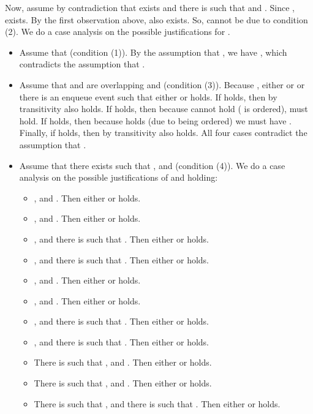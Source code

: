 \documentclass{LMCS}
\begin{document}
Now, assume by contradiction that  exists and there is  such that  and .
Since ,  exists.
By the first observation above,  also exists.
So,  cannot be due to condition (2).
We do a case analysis on the possible justifications for .
\begin{itemize}
\item Assume that  (condition (1)). 
By the assumption that , we have , which contradicts the assumption that .

\item Assume that  and  are overlapping and  (condition (3)).
Because , either  or  or there is an enqueue event  such that either  or  holds.
If  holds, then by transitivity  also holds.
If  holds, then because  cannot hold ( is ordered),  must hold.
If  holds, then because  holds (due to  being ordered) we must have .
Finally, if  holds, then by transitivity  also holds.
All four cases contradict the assumption that .

\item Assume that there exists  such that ,  and  (condition (4)).
We do a case analysis on the possible justifications of  and  holding:
\begin{itemize}

\item , and . 
Then either  or  holds.

\item , and .
Then either  or  holds.

\item , and there is  such that .
Then either  or  holds.

\item , and there is  such that .
Then either  or  holds.

\item , and .
Then either  or  holds.

\item , and .
Then either  or  holds.

\item , and there is  such that .
Then either  or  holds.

\item , and there is  such that .
Then either  or  holds.

\item There is  such that , and .
Then either  or  holds.

\item There is  such that , and .
Then either  or  holds.

\item There is  such that , and there is  such that .
Then either  or  holds.


\end{itemize}
\end{itemize}
\end{document}
